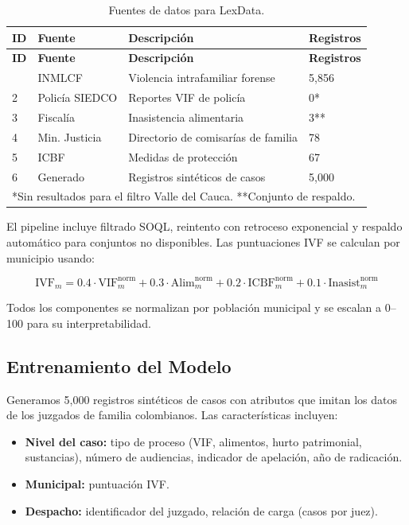 \documentclass[runningheads]{llncs}
\begin{document}
\begin{longtable}{p{1.5cm}p{3cm}p{4cm}p{2cm}}
\caption{Fuentes de datos para LexData.}
\label{tab:datasources}\\
\toprule
\textbf{ID} & \textbf{Fuente} & \textbf{Descripci\'{o}n} & \textbf{Registros} \\
\midrule
\endfirsthead
\toprule
\textbf{ID} & \textbf{Fuente} & \textbf{Descripci\'{o}n} & \textbf{Registros} \\
\midrule
\endhead
\bottomrule
\endfoot
1 & INMLCF & Violencia intrafamiliar forense & 5,856 \\
2 & Polic\'{i}a SIEDCO & Reportes VIF de polic\'{i}a & 0* \\
3 & Fiscal\'{i}a & Inasistencia alimentaria & 3** \\
4 & Min. Justicia & Directorio de comisar\'{i}as de familia & 78 \\
5 & ICBF & Medidas de protecci\'{o}n & 67 \\
6 & Generado & Registros sint\'{e}ticos de casos & 5,000 \\
\bottomrule
\multicolumn{4}{l}{*Sin resultados para el filtro Valle del Cauca. **Conjunto de respaldo.}
\end{longtable}

El pipeline incluye filtrado SOQL, reintento con retroceso exponencial y respaldo autom\'{a}tico para conjuntos no disponibles. Las puntuaciones IVF se calculan por municipio usando:

\begin{equation}
\text{IVF}_m = 0.4 \cdot \text{VIF}_m^{\text{norm}} + 0.3 \cdot \text{Alim}_m^{\text{norm}} + 0.2 \cdot \text{ICBF}_m^{\text{norm}} + 0.1 \cdot \text{Inasist}_m^{\text{norm}}
\label{eq:ivf}
\end{equation}

Todos los componentes se normalizan por poblaci\'{o}n municipal y se escalan a 0--100 para su interpretabilidad.

\subsection{Entrenamiento del Modelo}

Generamos 5,000 registros sint\'{e}ticos de casos con atributos que imitan los datos de los juzgados de familia colombianos. Las caracter\'{i}sticas incluyen:

\begin{itemize}
    \item \textbf{Nivel del caso:} tipo de proceso (VIF, alimentos, hurto patrimonial, sustancias), n\'{u}mero de audiencias, indicador de apelaci\'{o}n, a\~{n}o de radicaci\'{o}n.
    \item \textbf{Municipal:} puntuaci\'{o}n IVF.
    \item \textbf{Despacho:} identificador del juzgado, relaci\'{o}n de carga (casos por juez).
\end{itemize}
\end{document}
